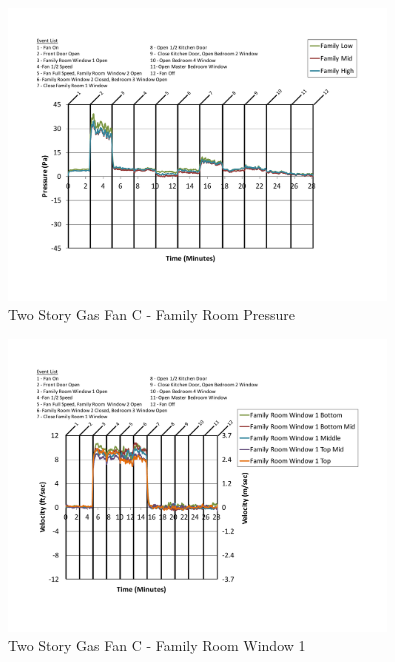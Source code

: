 \documentclass{article}
\begin{document}
\begin{appendices}
	\begin{figure}[H]
		\centering
		\includegraphics[height=3.05in,trim=0.67in 1.1in 0.67in 0.8in,clip=true]{0_Images/Results_Charts/ColdFlow/Two_Story/Gas/C/Family_Room_Pressure.pdf}
		\caption{Two Story Gas Fan C - Family Room Pressure}
	\end{figure}
 

	\begin{figure}[H]
		\centering
		\includegraphics[height=3.05in,trim=0.67in 1.1in 0.67in 0.8in,clip=true]{0_Images/Results_Charts/ColdFlow/Two_Story/Gas/C/Family_Room_Window_1.pdf}
		\caption{Two Story Gas Fan C - Family Room Window 1}
	\end{figure}
 
	\clearpage


\end{appendices}
\end{document}
